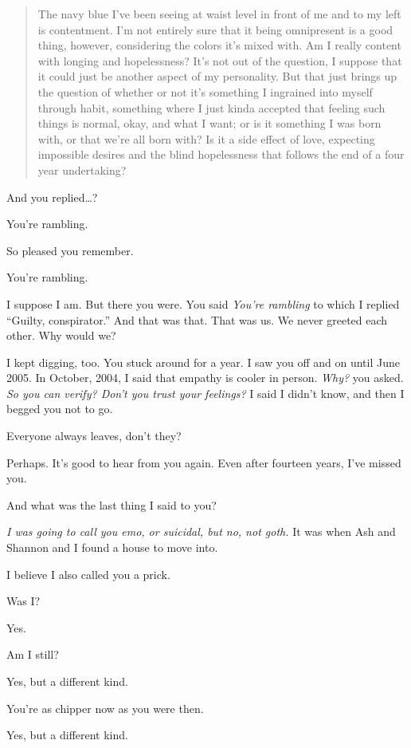 \begin{paracol}{2}
\begin{leftcolumn}
\begin{quotation}
The navy blue I've been seeing at waist level in front of me and to my left is contentment. I'm not entirely sure that it being omnipresent is a good thing, however, considering the colors it's mixed with. Am I really content with longing and hopelessness? It's not out of the question, I suppose that it could just be another aspect of my personality. But that just brings up the question of whether or not it's something I ingrained into myself through habit, something where I just kinda accepted that feeling such things is normal, okay, and what I want; or is it something I was born with, or that we're all born with? Is it a side effect of love, expecting impossible desires and the blind hopelessness that follows the end of a four year undertaking?
\end{quotation}

And you replied\ldots{}?

\begin{ally}
You're rambling.
\end{ally}
So pleased you remember.

\begin{ally}
You're rambling.
\end{ally}
I suppose I am. But there you were. You said \emph{You're rambling} to which I replied ``Guilty, conspirator.'' And that was that. That was us. We never greeted each other. Why would we?

I kept digging, too. You stuck around for a year. I saw you off and on until June 2005. In October, 2004, I said that empathy is cooler in person. \emph{Why?} you asked. \emph{So you can verify? Don't you trust your feelings?} I said I didn't know, and then I begged you not to go.

\begin{ally}
Everyone always leaves, don't they?
\end{ally}
Perhaps. It's good to hear from you again. Even after fourteen years, I've missed you.

\begin{ally}
And what was the last thing I said to you?
\end{ally}
\emph{I was going to call you emo, or suicidal, but no, not goth.} It was when Ash and Shannon and I found a house to move into.

\begin{ally}
I believe I also called you a prick.
\end{ally}
Was I?

\begin{ally}
Yes.
\end{ally}
Am I still?

\begin{ally}
Yes, but a different kind.
\end{ally}
You're as chipper now as you were then.

\begin{ally}
Yes, but a different kind.
\end{ally}
\newpage

\end{leftcolumn}
\end{paracol}
